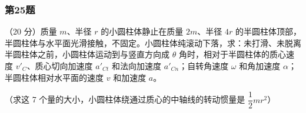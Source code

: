 \documentclass[12pt,a4paper]{ctexart}
\begin{document}
\subsubsection*{第25题}
\begin{tcolorbox}[colback=gray!2!white,colframe=black!60,title={题目}]
（20 分）质量 \(m\)、半径 \(r\) 的小圆柱体静止在质量 \(2m\)、半径 \(4r\) 的半圆柱体顶部，半圆柱体与水平面光滑接触，不固定。小圆柱体纯滚动下落，求：未打滑、未脱离半圆柱体之前，小圆柱体运动到与竖直方向成 \(\theta\) 角时，相对于半圆柱体的质心速度 \(v'_C\)、质心切向加速度 \(a'_{Ct}\) 和法向加速度 \(a'_{Cn}\)；自转角速度 \(\omega\) 和角加速度 \(\alpha\)；半圆柱体相对水平面的速度 \(v\) 和加速度 \(a\)。\par
（求这 7 个量的大小，小圆柱体绕通过质心的中轴线的转动惯量是 \(\dfrac{1}{2}mr^2\)）\par
\end{tcolorbox}
\end{document}
